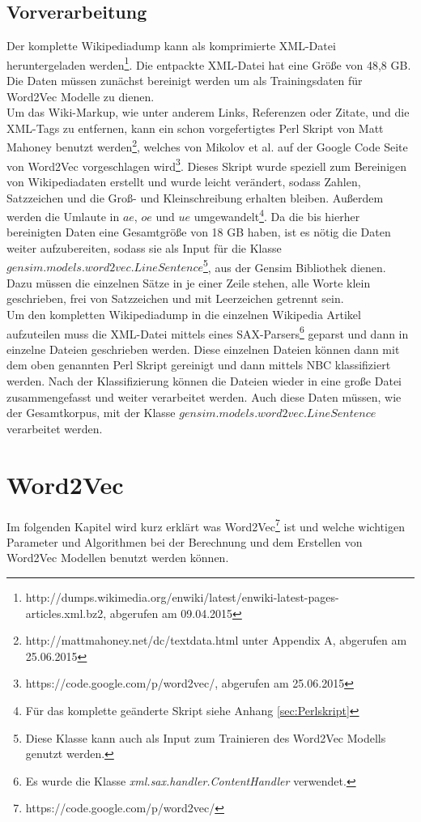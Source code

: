 \documentclass[12pt,a4paper]{report}
\begin{document}
	\section{Vorverarbeitung}
	\label{sec:Vorverarbeitung}
	Der komplette Wikipediadump kann als komprimierte XML-Datei heruntergeladen werden\footnote{http://dumps.wikimedia.org/enwiki/latest/enwiki-latest-pages-articles.xml.bz2, abgerufen am 09.04.2015}. Die entpackte XML-Datei hat eine Größe von 48,8 GB. Die Daten müssen zunächst bereinigt werden um als Trainingsdaten für Word2Vec Modelle zu dienen.\\		
	Um das Wiki-Markup, wie unter anderem Links, Referenzen oder Zitate, und die XML-Tags zu entfernen, kann ein schon vorgefertigtes Perl Skript von Matt Mahoney benutzt werden\footnote{http://mattmahoney.net/dc/textdata.html unter Appendix A, abgerufen am 25.06.2015}, welches von Mikolov et al. auf der Google Code Seite von Word2Vec vorgeschlagen wird\footnote{https://code.google.com/p/word2vec/, abgerufen am 25.06.2015}. Dieses Skript wurde speziell zum Bereinigen von Wikipediadaten erstellt und wurde leicht verändert, sodass Zahlen, Satzzeichen und die Groß- und Kleinschreibung erhalten bleiben. Außerdem werden die Umlaute in $ae$, $oe$ und $ue$ umgewandelt\footnote{Für das komplette geänderte Skript siehe Anhang \ref{sec:Perlskript}}. Da die bis hierher bereinigten Daten eine Gesamtgröße von 18 GB haben, ist es nötig die Daten weiter aufzubereiten, sodass sie als Input für die Klasse $gensim.models.word2vec.LineSentence$\footnote{Diese Klasse kann auch als Input zum Trainieren des Word2Vec Modells genutzt werden.}, aus der Gensim Bibliothek dienen. Dazu müssen die einzelnen Sätze in je einer Zeile stehen, alle Worte klein geschrieben, frei von Satzzeichen und mit Leerzeichen getrennt sein.\\	
	Um den kompletten Wikipediadump in die einzelnen Wikipedia Artikel aufzuteilen muss die XML-Datei mittels eines SAX-Parsers\footnote{Es wurde die Klasse \textit{xml.sax.handler.ContentHandler} verwendet.} geparst und dann in einzelne Dateien geschrieben werden. Diese einzelnen Dateien können dann mit dem oben genannten Perl Skript gereinigt und dann mittels NBC klassifiziert werden. Nach der Klassifizierung können die Dateien wieder in eine große Datei zusammengefasst und weiter verarbeitet werden. Auch diese Daten müssen, wie der Gesamtkorpus, mit der Klasse $gensim.models.word2vec.LineSentence$ verarbeitet werden.
	
	
\newpage
\chapter{Word2Vec}
Im folgenden Kapitel wird kurz erklärt was Word2Vec\footnote{https://code.google.com/p/word2vec/} ist und welche wichtigen Parameter und Algorithmen bei der Berechnung und dem Erstellen von Word2Vec Modellen benutzt werden können.\\
\end{document}
